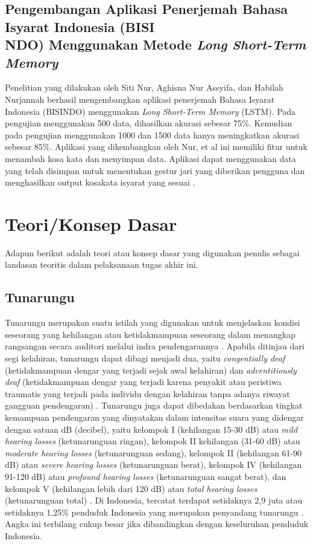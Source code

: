 \subsection{Pengembangan Aplikasi Penerjemah Bahasa Isyarat Indonesia (BISI\\NDO) Menggunakan Metode \textit{Long Short-Term Memory}}
Penelitian yang dilakukan oleh Siti Nur, Aghisna Nur Assyifa, dan Habilah Nurjannah berhasil mengembangkan aplikasi penerjemah Bahasa Isyarat Indonesia (BISINDO) menggunakan \emph{Long Short-Term Memory} (LSTM). Pada pengujian menggunakan 500 data, dihasilkan akurasi sebesar 75\%. Kemudian pada pengujian menggunakan 1000 dan 1500 data hanya meningkatkan akurasi sebesar 85\%. Aplikasi yang dikembangkan oleh Nur, et al ini memiliki fitur untuk menambah kosa kata dan menyimpan data. Aplikasi dapat menggunakan data yang telah disimpan untuk menentukan gestur jari yang diberikan pengguna dan menghasilkan output kosakata isyarat yang sesuai \parencite{nur2023}.

\newpage

\section{Teori/Konsep Dasar}
Adapun berikut adalah teori atau konsep dasar yang digunakan penulis sebagai landasan teoritis dalam pelaksanaan tugas akhir ini.

\subsection{Tunarungu} 

Tunarungu merupakan suatu istilah yang digunakan untuk menjelaskan kondisi seseorang yang kehilangan atau ketidakmampuan seseorang dalam menangkap rangsangan secara auditori melalui indra pendengarannya \parencite{somantri2006}. Apabila ditinjau dari segi kelahiran, tunarungu dapat dibagi menjadi dua, yaitu \emph{congentially deaf} (ketidakmampuan dengar yang terjadi sejak awal kelahiran) dan \emph{adventitiously deaf} (ketidakmampuan dengar yang terjadi karena penyakit atau peristiwa traumatis yang terjadi pada individu dengan kelahiran tanpa adanya riwayat gangguan pendengaran) \parencite{hallahan2009}. Tunarungu juga dapat dibedakan berdasarkan tingkat kemampuan pendengaran yang dinyatakan dalam intensitas suara yang didengar dengan satuan dB (decibel), yaitu kelompok I (kehilangan 15-30 dB) atau \emph{mild hearing losses} (ketunarunguan ringan), kelompok II kehilangan (31-60 dB) atau \emph{moderate hearing losses} (ketunarunguan sedang), kelompok II (kehilangan 61-90 dB) atau \emph{severe hearing losses} (ketunarunguan berat), kelompok IV (kehilangan 91-120 dB) atau \emph{profound hearing losses} (ketunarunguan sangat berat), dan kelompok V (kehilangan lebih dari 120 dB) atau \emph{total hearing losses} (ketunarunguan total) \parencite{winarsih2007}. Di Indonesia, tercatat terdapat setidaknya 2,9 juta atau setidaknya 1,25\% penduduk Indonesia yang merupakan penyandang tunarungu \parencite{evitasari2015}. Angka ini terbilang cukup besar jika dibandingkan dengan keseluruhan penduduk Indonesia.

